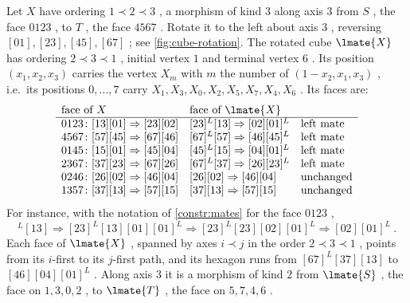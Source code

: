 \begin{exmp}
\label{exmp:cube-rotation}
%
Let $X$ have ordering $1 \prec 2 \prec 3$ ,
a morphism of kind $3$ along axis $3$ from $S$ , the face $0123$ , to $T$ ,
the face $4567$ . Rotate it to the left about axis $3$ ,
reversing $[01],[23],[45],[67]$ ; see \cref{fig:cube-rotation}.
The rotated cube $\lmate{X}$ has ordering $2 \prec 3 \prec 1$ ,
initial vertex $1$ and terminal vertex $6$ .
Its position $(x_{1},x_{2},x_{3})$ carries the vertex $X_{m}$ with $m$ the
number of
$(1-x_{2},x_{1},x_{3})$ ,
i.e.\ its positions $0,\dots,7$ carry
$X_{1},X_{3},X_{0},X_{2},X_{5},X_{7},X_{4},X_{6}$ .
Its faces are:
\begin{equation*}
\begin{array}{lll}
\text{face of } X & \text{face of } \lmate{X} & \\ \hline
0123\colon [13][01] \Rightarrow [23][02] & [23]^{L}[13] \Rightarrow [02][01]^{L}
& \text{left mate} \\
4567\colon [57][45] \Rightarrow [67][46] & [67]^{L}[57] \Rightarrow [46][45]^{L}
& \text{left mate} \\
0145\colon [15][01] \Rightarrow [45][04] & [45]^{L}[15] \Rightarrow [04][01]^{L}
& \text{left mate} \\
2367\colon [37][23] \Rightarrow [67][26] & [67]^{L}[37] \Rightarrow [26][23]^{L}
& \text{left mate} \\
0246\colon [26][02] \Rightarrow [46][04] & [26][02] \Rightarrow [46][04] &
\text{unchanged} \\
1357\colon [37][13] \Rightarrow [57][15] & [37][13] \Rightarrow [57][15] &
\text{unchanged}
\end{array}
\end{equation*}
For instance, with the notation of \cref{constr:mates} for the face $0123$ ,
\begin{equation*}
[23]^{L}[13] \Rightarrow [23]^{L}[13][01][01]^{L} \Rightarrow
[23]^{L}[23][02][01]^{L} \Rightarrow [02][01]^{L} \ .
\end{equation*}
Each face of $\lmate{X}$ , spanned by axes $i \prec j$ in the order $2 \prec 3
\prec 1$ , points from its $i$-first to its $j$-first path,
and its hexagon runs from $[67]^{L}[37][13]$ to $[46][04][01]^{L}$ .
Along axis $3$ it is a morphism of kind $2$ from $\lmate{S}$ ,
the face on $1,3,0,2$ , to $\lmate{T}$ , the face on $5,7,4,6$ .
\end{exmp}

